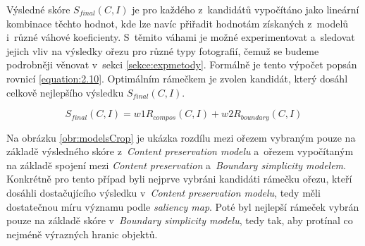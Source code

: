 \begin{enumerate}
Výsledné skóre $S_{final} (C, I)$ je pro každého z~kandidátů vypočítáno jako lineární kombinace těchto hodnot, kde lze navíc přiřadit hodnotám získaných z~modelů i~různé váhové koeficienty. S~těmito váhami je možné experimentovat a~sledovat jejich vliv na výsledky ořezu pro různé typy fotografií, čemuž se budeme podrobněji věnovat v~sekci \ref{sekce:expmetody}. Formálně je tento výpočet popsán rovnicí \ref{equation:2.10}. Optimálním rámečkem je zvolen kandidát, který dosáhl celkově nejlepšího výsledku $S_{final} (C, I)$.

\begin{equation} \label{equation:2.10}
S_{final} (C, I) = w1 R_{compos} (C, I) + w2 R_{boundary} (C, I)
\end{equation}
\end{enumerate}

Na obrázku \ref{obr:modelsCrop} je ukázka rozdílu mezi ořezem vybraným pouze na základě výsledného skóre z~\emph{Content preservation modelu} a~ořezem vypočítaným na základě spojení mezi \emph{Content preservation} a~\emph{Boundary simplicity modelem}. Konkrétně pro tento případ byli nejprve vybráni kandidáti rámečku ořezu, kteří dosáhli dostačujícího výsledku v~\emph{Content preservation modelu}, tedy měli dostatečnou míru významu podle \emph{saliency map}. Poté byl nejlepší rámeček vybrán pouze na základě skóre v~\emph{Boundary simplicity modelu}, tedy tak, aby protínal co nejméně výrazných hranic objektů.

